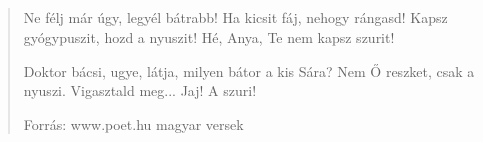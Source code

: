 \documentclass[twocolumn,twoside]{article}
\begin{document}
\subsection{}
\subsection{}

\begin{quote}
\lipsum[1]
\end{quote}

\begin{quotation}
\lipsum[1]
\lipsum[2]
\end{quotation}

\begin{verse}
Ne félj már úgy, legyél bátrabb!
Ha kicsit fáj, nehogy rángasd!
Kapsz gyógypuszit, hozd a nyuszit!
Hé, Anya, Te nem kapsz szurit!

Doktor bácsi, ugye, látja,
milyen bátor a kis Sára?
Nem Ő reszket, csak a nyuszi.
Vigasztald meg... Jaj! A szuri!

Forrás: www.poet.hu magyar versek
\end{verse}
\end{document}
